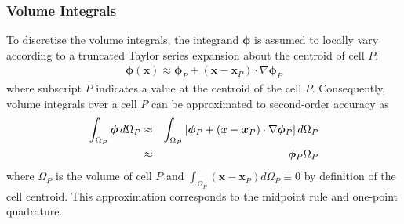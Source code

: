 \documentclass[sn-mathphys,Numbered]{sn-jnl}%
\newcommand{\bb}{\boldsymbol}
\begin{document}
\subsubsection{Volume Integrals}
To discretise the volume integrals, the integrand $\bb{\phi}$ is assumed to locally vary according to a truncated Taylor series expansion about the centroid of cell $P$:
\begin{eqnarray}
	\bb{\phi}(\bb{x})  \approx \bb{\phi}_P + (\bb{x} - \bb{x}_P) \cdot \nabla \bb{\phi}_P
\end{eqnarray}
where subscript $P$ indicates a value at the centroid of the cell $P$.
Consequently, volume integrals over a cell $P$ can be approximated to second-order accuracy as
\begin{eqnarray} \label{eq:volume_integral}
	\int_{\Omega_P} \bb{\phi} \, d \Omega_P
		&\approx& \int_{\Omega_P}  \left[ \bb{\phi}_P + (\bb{x} - \bb{x}_P) \cdot \nabla \bb{\phi}_P \right] d \Omega_P \notag \\
		&\approx& \bb{\phi}_P \Omega_P
\end{eqnarray}
where $\Omega_P$ is the volume of cell $P$ and $\int_{\Omega_P} (\bb{x} - \bb{x}_P) d\Omega_P \equiv 0$ by definition of the cell centroid.
This approximation corresponds to the midpoint rule and one-point quadrature.
\end{document}
